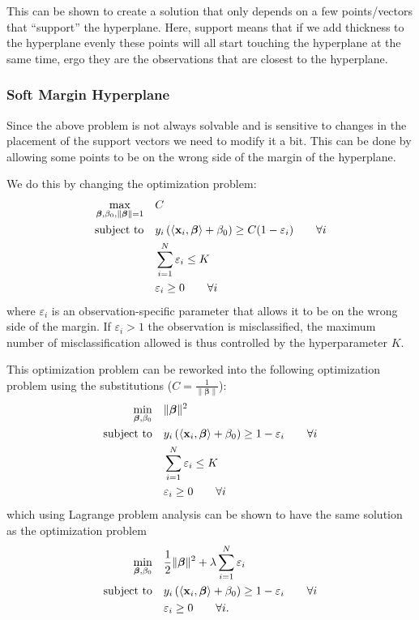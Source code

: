 \documentclass[a4paper, 12pt]{scrartcl}
\newcommand{\bfbeta}{\boldsymbol{\beta}}
\newcommand{\bfx}{\mathbf{x}}
\newcommand{\inner}[2]{\left\langle #1, #2 \right\rangle}
\begin{document}
This can be shown to create a solution that only depends on a few points/vectors that ``support'' the hyperplane.
Here, support means that if we add thickness to the hyperplane evenly these points will all start touching the hyperplane at the same time, ergo they are the observations that are closest to the hyperplane.

\subsubsection*{Soft Margin Hyperplane}
Since the above problem is not always solvable and is sensitive to changes in the placement of the support vectors we need to modify it a bit.
This can be done by allowing some points to be on the wrong side of the margin of the hyperplane.

\begin{algorithm}
We do this by changing the optimization problem:
\begin{equation*}
\begin{aligned}
\operatornamewithlimits{max}_{\bfbeta,\beta_0,\|\bfbeta\|=1} & & &C\\
\text{subject to} & & & y_i\left(\inner{\bfx_i}{\bfbeta}+\beta_0\right)\geq C(1-\varepsilon_i)\qquad \forall i\\
& & & \sum_{i=1}^{N}\varepsilon_i\leq K\\
& & & \varepsilon_i \geq 0 \qquad \forall i
\end{aligned}
\end{equation*}
where $\varepsilon_i$ is an observation-specific parameter that allows it to be on the wrong side of the margin.
If $\varepsilon_i>1$ the observation is misclassified, the maximum number of misclassification allowed is thus controlled by the hyperparameter $K$.
\end{algorithm}

This optimization problem can be reworked into the following optimization problem using the substitutions ($C=\frac{1}{\|\bfbeta\|}$):
\begin{equation*}
\begin{aligned}
\operatornamewithlimits{min}_{\bfbeta,\beta_0} & & &\|\bfbeta\|^2\\
\text{subject to} & & & y_i\left(\inner{\bfx_i}{\bfbeta}+\beta_0\right)\geq 1-\varepsilon_i\qquad\forall i\\
& & & \sum_{i=1}^{N}\varepsilon_i\leq K\\
& & & \varepsilon_i \geq 0\qquad\forall i
\end{aligned}
\end{equation*}
which using Lagrange problem analysis can be shown to have the same solution as the optimization problem
\begin{equation*}
\begin{aligned}
\operatornamewithlimits{min}_{\bfbeta,\beta_0} & & &\frac{1}{2}\|\bfbeta\|^2+\lambda\sum_{i=1}^{N}\varepsilon_i
\\
\text{subject to} & & & y_i\left(\inner{\bfx_i}{\bfbeta}+\beta_0\right)\geq 1-\varepsilon_i\qquad\forall i\\
& & & \varepsilon_i \geq 0\qquad\forall i.
\end{aligned}
\end{equation*}
\end{document}

